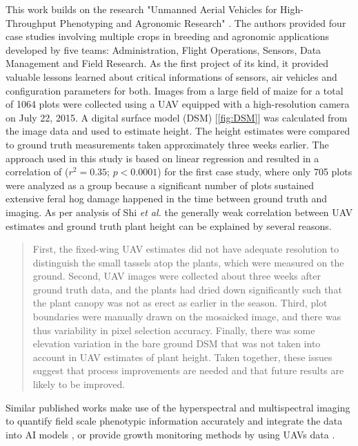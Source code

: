 This work builds on the research "Unmanned Aerial Vehicles for High-Throughput Phenotyping and Agronomic Research" \cite{UAV_HTPAR_2016}.
The authors provided four case studies involving multiple crops in breeding and agronomic applications developed by five teams: Administration, Flight Operations, Sensors, Data Management and Field Research. As the first project of its kind, it provided valuable lessons learned about critical informations of sensors, air vehicles and configuration parameters for both.
Images from a large field of maize for a total of 1064 plots were collected using a UAV equipped with a high-resolution camera on July 22, 2015.
A digital surface model (DSM) [\ref{fig:DSM}] was calculated from the image data and used to estimate height. The height estimates were compared to ground truth measurements taken approximately three weeks earlier.
The approach used in this study is based on linear regression and resulted in a correlation of ($r^2 = 0.35$; $p<0.0001$) for the first case study, where only 705 plots were analyzed as a group because a significant number of plots sustained extensive feral hog damage happened in the time between ground truth and imaging.
As per analysis of Shi \textit{et al.}\cite{UAV_HTPAR_2016} the generally weak correlation between UAV estimates and ground truth plant height can be explained by several reasons.
\begin{quote}
    First, the fixed-wing UAV estimates did not have adequate resolution to distinguish the small tassels atop the plants, which were measured on the ground. Second, UAV images were collected about three weeks after ground truth data, and the plants had dried down significantly such that the plant canopy was not as erect as earlier in the season. Third, plot boundaries were manually drawn on the mosaicked image, and there was thus variability in pixel selection accuracy. Finally, there was some elevation variation in the bare ground DSM that was not taken into account in UAV estimates of plant height. Taken together, these issues suggest that process improvements are needed and that future results are likely to be improved.
\end{quote}
Similar published works make use of the hyperspectral and multispectral imaging to  quantify field scale phenotypic information accurately and integrate the data into AI models \cite{jung2021potential}, or provide growth monitoring methods by using UAVs data \cite{chang2017crop}.